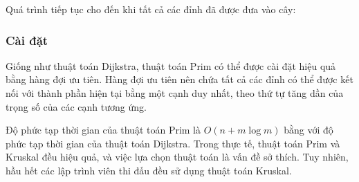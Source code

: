 \begin{samepage}
Quá trình tiếp tục cho đến khi tất cả các đỉnh đã được đưa vào cây:
\begin{center}
\end{center}
\end{samepage}

\subsubsection{Cài đặt}

Giống như thuật toán Dijkstra, thuật toán Prim có thể được
cài đặt hiệu quả bằng hàng đợi ưu tiên.
Hàng đợi ưu tiên nên chứa tất cả các đỉnh
có thể được kết nối với thành phần hiện tại bằng
một cạnh duy nhất, theo thứ tự tăng dần của trọng số
của các cạnh tương ứng.

Độ phức tạp thời gian của thuật toán Prim là
$O(n + m \log m)$ bằng với độ phức tạp thời gian
của thuật toán Dijkstra.
Trong thực tế, thuật toán Prim và Kruskal
đều hiệu quả, và việc lựa chọn thuật toán
là vấn đề sở thích.
Tuy nhiên, hầu hết các lập trình viên thi đấu đều sử dụng thuật toán Kruskal.